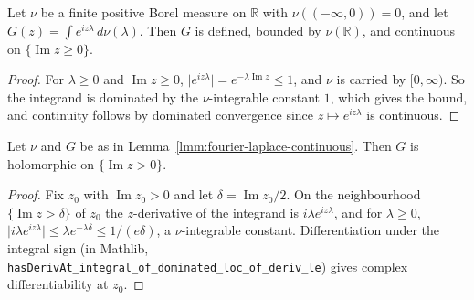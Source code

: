\begin{lemma}
    \label{lmm:fourier-laplace-continuous}
    \leanok
    Let $\nu$ be a finite positive Borel measure on $\mathbb{R}$ with $\nu((-\infty, 0)) = 0$, and let $G(z) = \int e^{iz\lambda} \, d\nu(\lambda)$. Then $G$ is defined, bounded by $\nu(\mathbb{R})$, and continuous on $\{\operatorname{Im} z \ge 0\}$.
\end{lemma}
\begin{proof}
    \leanok
    For $\lambda \ge 0$ and $\operatorname{Im} z \ge 0$, $\lvert e^{iz\lambda} \rvert = e^{-\lambda \operatorname{Im} z} \le 1$, and $\nu$ is carried by $[0, \infty)$. So the integrand is dominated by the $\nu$-integrable constant $1$, which gives the bound, and continuity follows by dominated convergence since $z \mapsto e^{iz\lambda}$ is continuous.
\end{proof}

\begin{lemma}
    \label{lmm:fourier-laplace-holomorphic}
    \leanok
    Let $\nu$ and $G$ be as in Lemma~\ref{lmm:fourier-laplace-continuous}. Then $G$ is holomorphic on $\{\operatorname{Im} z > 0\}$.
\end{lemma}
\begin{proof}
    \leanok
    Fix $z_0$ with $\operatorname{Im} z_0 > 0$ and let $\delta = \operatorname{Im} z_0 / 2$. On the neighbourhood $\{\operatorname{Im} z > \delta\}$ of $z_0$ the $z$-derivative of the integrand is $i\lambda e^{iz\lambda}$, and for $\lambda \ge 0$, $\lvert i\lambda e^{iz\lambda} \rvert \le \lambda e^{-\lambda\delta} \le 1/(e\delta)$, a $\nu$-integrable constant. Differentiation under the integral sign (in Mathlib, \texttt{hasDerivAt\_integral\_of\_dominated\_loc\_of\_deriv\_le}) gives complex differentiability at $z_0$.
\end{proof}

